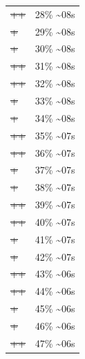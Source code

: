 \documentclass[12pt]{article}
\begin{document}
\begin{center}
\begin{tabular}{ll}
\sout{\sout{\sout{\sout{\sout{\sout{++}}}}}} & 28\% \textasciitilde{}08s\\
\sout{\sout{\sout{\sout{\sout{\sout{\sout{+}}}}}}} & 29\% \textasciitilde{}08s\\
\sout{\sout{\sout{\sout{\sout{\sout{\sout{+}}}}}}} & 30\% \textasciitilde{}08s\\
\sout{\sout{\sout{\sout{\sout{\sout{\sout{++}}}}}}} & 31\% \textasciitilde{}08s\\
\sout{\sout{\sout{\sout{\sout{\sout{\sout{++}}}}}}} & 32\% \textasciitilde{}08s\\
\sout{\sout{\sout{\sout{\sout{\sout{\sout{\sout{+}}}}}}}} & 33\% \textasciitilde{}08s\\
\sout{\sout{\sout{\sout{\sout{\sout{\sout{\sout{+}}}}}}}} & 34\% \textasciitilde{}08s\\
\sout{\sout{\sout{\sout{\sout{\sout{\sout{\sout{++}}}}}}}} & 35\% \textasciitilde{}07s\\
\sout{\sout{\sout{\sout{\sout{\sout{\sout{\sout{++}}}}}}}} & 36\% \textasciitilde{}07s\\
\sout{\sout{\sout{\sout{\sout{\sout{\sout{\sout{\sout{+}}}}}}}}} & 37\% \textasciitilde{}07s\\
\sout{\sout{\sout{\sout{\sout{\sout{\sout{\sout{\sout{+}}}}}}}}} & 38\% \textasciitilde{}07s\\
\sout{\sout{\sout{\sout{\sout{\sout{\sout{\sout{\sout{++}}}}}}}}} & 39\% \textasciitilde{}07s\\
\sout{\sout{\sout{\sout{\sout{\sout{\sout{\sout{\sout{++}}}}}}}}} & 40\% \textasciitilde{}07s\\
\sout{\sout{\sout{\sout{\sout{\sout{\sout{\sout{\sout{\sout{+}}}}}}}}}} & 41\% \textasciitilde{}07s\\
\sout{\sout{\sout{\sout{\sout{\sout{\sout{\sout{\sout{\sout{+}}}}}}}}}} & 42\% \textasciitilde{}07s\\
\sout{\sout{\sout{\sout{\sout{\sout{\sout{\sout{\sout{\sout{++}}}}}}}}}} & 43\% \textasciitilde{}06s\\
\sout{\sout{\sout{\sout{\sout{\sout{\sout{\sout{\sout{\sout{++}}}}}}}}}} & 44\% \textasciitilde{}06s\\
\sout{\sout{\sout{\sout{\sout{\sout{\sout{\sout{\sout{\sout{\sout{+}}}}}}}}}}} & 45\% \textasciitilde{}06s\\
\sout{\sout{\sout{\sout{\sout{\sout{\sout{\sout{\sout{\sout{\sout{+}}}}}}}}}}} & 46\% \textasciitilde{}06s\\
\sout{\sout{\sout{\sout{\sout{\sout{\sout{\sout{\sout{\sout{\sout{++}}}}}}}}}}} & 47\% \textasciitilde{}06s\\

\end{tabular}
\end{center}
\end{document}
